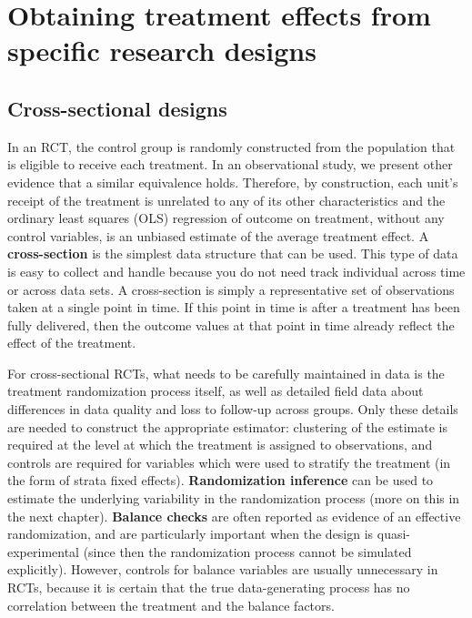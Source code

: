 \section{Obtaining treatment effects from specific research designs}


\subsection{Cross-sectional designs}

In an RCT, the control group is randomly constructed
from the population that is eligible to receive each treatment.
In an observational study, we present other evidence that a similar equivalence holds.
Therefore, by construction, each unit's receipt of the treatment
is unrelated to any of its other characteristics
and the ordinary least squares (OLS) regression
of outcome on treatment, without any control variables,
is an unbiased estimate of the average treatment effect.
A \textbf{cross-section} is the simplest data structure that can be used.
This type of data is easy to collect and handle because
you do not need track individual across time or across data sets.
A cross-section is simply a representative set of observations
taken at a single point in time.
If this point in time is after a treatment has been fully delivered,
then the outcome values at that point in time
already reflect the effect of the treatment.

For cross-sectional RCTs, what needs to be carefully maintained in data
is the treatment randomization process itself,
as well as detailed field data about differences
in data quality and loss to follow-up across groups.\cite{athey2017econometrics}
Only these details are needed to construct the appropriate estimator:
clustering of the estimate is required at the level
at which the treatment is assigned to observations,
and controls are required for variables which
were used to stratify the treatment (in the form of strata fixed effects).
\textbf{Randomization inference} can be used
to estimate the underlying variability in the randomization process
(more on this in the next chapter).
\textbf{Balance checks}
are often reported as evidence of an effective randomization,
and are particularly important when the design is quasi-experimental
(since then the randomization process cannot be simulated explicitly).
However, controls for balance variables are usually unnecessary in RCTs,
because it is certain that the true data-generating process
has no correlation between the treatment and the balance factors.

